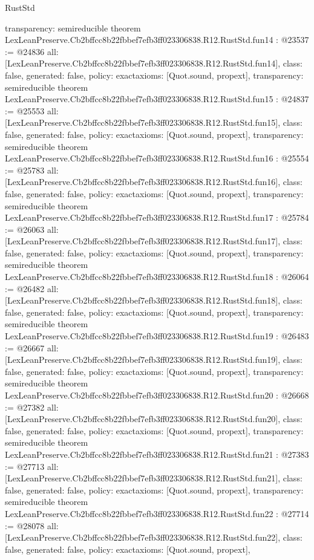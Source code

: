 \begin{lexlean}{RustStd}
\begin{coremodule}
{  transparency: semireducible
}
theorem LexLeanPreserve.Cb2bffcc8b22fbbef7efb3ff023306838.R12.RustStd.fun14 : @23537 := @24836 {
  all: [LexLeanPreserve.Cb2bffcc8b22fbbef7efb3ff023306838.R12.RustStd.fun14],
  class: false,
  generated: false,
  policy: exact{axioms: [Quot.sound, propext]},
  transparency: semireducible
}
theorem LexLeanPreserve.Cb2bffcc8b22fbbef7efb3ff023306838.R12.RustStd.fun15 : @24837 := @25553 {
  all: [LexLeanPreserve.Cb2bffcc8b22fbbef7efb3ff023306838.R12.RustStd.fun15],
  class: false,
  generated: false,
  policy: exact{axioms: [Quot.sound, propext]},
  transparency: semireducible
}
theorem LexLeanPreserve.Cb2bffcc8b22fbbef7efb3ff023306838.R12.RustStd.fun16 : @25554 := @25783 {
  all: [LexLeanPreserve.Cb2bffcc8b22fbbef7efb3ff023306838.R12.RustStd.fun16],
  class: false,
  generated: false,
  policy: exact{axioms: [Quot.sound, propext]},
  transparency: semireducible
}
theorem LexLeanPreserve.Cb2bffcc8b22fbbef7efb3ff023306838.R12.RustStd.fun17 : @25784 := @26063 {
  all: [LexLeanPreserve.Cb2bffcc8b22fbbef7efb3ff023306838.R12.RustStd.fun17],
  class: false,
  generated: false,
  policy: exact{axioms: [Quot.sound, propext]},
  transparency: semireducible
}
theorem LexLeanPreserve.Cb2bffcc8b22fbbef7efb3ff023306838.R12.RustStd.fun18 : @26064 := @26482 {
  all: [LexLeanPreserve.Cb2bffcc8b22fbbef7efb3ff023306838.R12.RustStd.fun18],
  class: false,
  generated: false,
  policy: exact{axioms: [Quot.sound, propext]},
  transparency: semireducible
}
theorem LexLeanPreserve.Cb2bffcc8b22fbbef7efb3ff023306838.R12.RustStd.fun19 : @26483 := @26667 {
  all: [LexLeanPreserve.Cb2bffcc8b22fbbef7efb3ff023306838.R12.RustStd.fun19],
  class: false,
  generated: false,
  policy: exact{axioms: [Quot.sound, propext]},
  transparency: semireducible
}
theorem LexLeanPreserve.Cb2bffcc8b22fbbef7efb3ff023306838.R12.RustStd.fun20 : @26668 := @27382 {
  all: [LexLeanPreserve.Cb2bffcc8b22fbbef7efb3ff023306838.R12.RustStd.fun20],
  class: false,
  generated: false,
  policy: exact{axioms: [Quot.sound, propext]},
  transparency: semireducible
}
theorem LexLeanPreserve.Cb2bffcc8b22fbbef7efb3ff023306838.R12.RustStd.fun21 : @27383 := @27713 {
  all: [LexLeanPreserve.Cb2bffcc8b22fbbef7efb3ff023306838.R12.RustStd.fun21],
  class: false,
  generated: false,
  policy: exact{axioms: [Quot.sound, propext]},
  transparency: semireducible
}
theorem LexLeanPreserve.Cb2bffcc8b22fbbef7efb3ff023306838.R12.RustStd.fun22 : @27714 := @28078 {
  all: [LexLeanPreserve.Cb2bffcc8b22fbbef7efb3ff023306838.R12.RustStd.fun22],
  class: false,
  generated: false,
  policy: exact{axioms: [Quot.sound, propext]},
}
\end{coremodule}
\end{lexlean}
